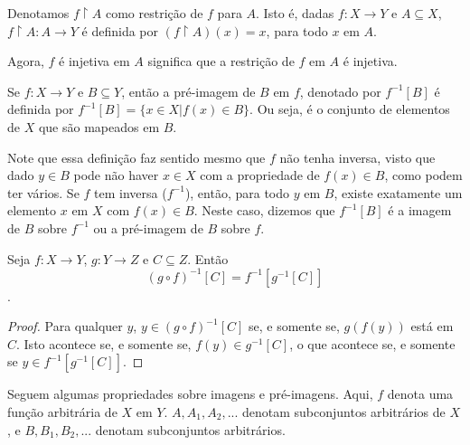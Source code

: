 \begin{definition}
    \label{def9}
    Denotamos $f \upharpoonright A$ como restrição de $f$ para $A$. Isto é, dadas $f: X \to Y$
    e $A \subseteq X$, $f \upharpoonright A : A \to Y$ é definida por $(f \upharpoonright A)(x) = x$,
    para todo $x$ em $A$.
\end{definition}

Agora, $f$ é injetiva em $A$ significa que a restrição de $f$ em $A$ é injetiva.

\begin{definition}
    \label{def10}
    Se $f: X \to Y$ e $B \subseteq Y$, então a pré-imagem de $B$ em $f$, denotado por $f^{-1}[B]$ é
    definida por $f^{-1}[B] = \{x \in X | f(x) \in B\}$. Ou seja, é o conjunto de elementos de $X$ que
    são mapeados em $B$.
\end{definition}

Note que essa definição faz sentido mesmo que $f$ não tenha inversa, visto que dado $y \in B$ pode não
haver $x \in X$ com a propriedade de $f(x) \in B$, como podem ter vários. Se $f$ tem inversa ($f^{-1}$),
então, para todo $y$ em $B$, existe exatamente um elemento $x$ em $X$ com $f(x) \in B$. Neste caso,
dizemos que $f^{-1}[B]$ é a imagem de $B$ sobre $f^{-1}$ ou a pré-imagem de $B$ sobre $f$.

\begin{theorem}
    Seja $f: X \to Y$, $g: Y \to Z$ e $C \subseteq Z$. Então $$(g \circ f)^{-1}[C] = f^{-1}[g^{-1}[C]]$$.
\end{theorem}
\begin{proof}
    Para qualquer $y$, $y \in (g \circ f)^{-1}[C]$ se, e somente se, $g(f(y))$ está em $C$.
    Isto acontece se, e somente se, $f(y) \in g^{-1}[C]$, o que acontece se, e somente se $y \in f^{-1}[g^{-1}[C]]$.
\end{proof}

Seguem algumas propriedades sobre imagens e pré-imagens. Aqui, $f$ denota uma função
arbitrária de $X$ em $Y$. $A, A_1, A_2, ...$ denotam subconjuntos arbitrários de $X$,
e $B, B_1, B_2,...$ denotam subconjuntos arbitrários.

